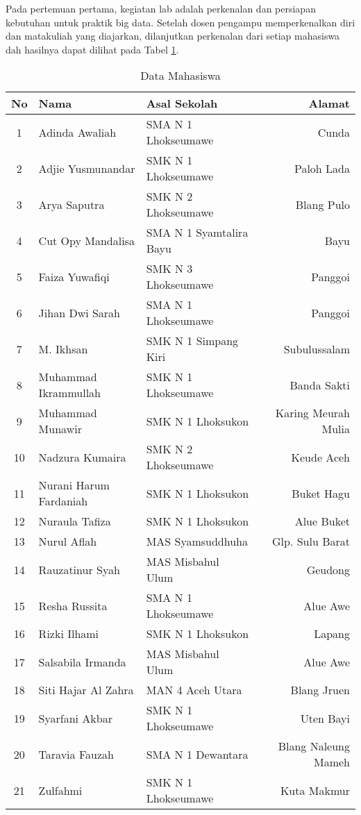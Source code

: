 \documentclass[a4paper]{tufte-handout}
\begin{document}
\clearpage
{}


Pada pertemuan pertama, kegiatan lab adalah perkenalan dan persiapan kebutuhan untuk praktik big data. Setelah dosen pengampu memperkenalkan diri dan matakuliah yang diajarkan, dilanjutkan perkenalan dari setiap mahasiswa dah hasilnya dapat dilihat pada Tabel \ref{tab:perkenalan}.

\begin{table}[!ht]
\vspace*{.5cm}
\caption{Data Mahasiswa}
\label{tab:perkenalan}
\centering
\begin{tabular}{cllr} 
\toprule
No & Nama 				& Asal Sekolah 				& Alamat\\
\midrule
1 	& Adinda Awaliah	& SMA N 1 Lhokseumawe 		& Cunda \\
2 	& Adjie Yusmunandar	& SMK N 1 Lhokseumawe 		& Paloh Lada \\
3 	& Arya Saputra 		& SMK N 2 Lhokseumawe 		& Blang Pulo \\
4 	& Cut Opy Mandalisa	& SMA N 1 Syamtalira Bayu	& Bayu \\
5 	& Faiza Yuwafiqi	& SMK N 3 Lhokseumawe 		& Panggoi \\
6 	& Jihan Dwi Sarah	& SMA N 1 Lhokseumawe 		& Panggoi \\
7 	& M. Ikhsan			& SMK N 1 Simpang Kiri 		& Subulussalam \\
\midrule
8 	& Muhammad Ikrammullah		& SMK N 1 Lhokseumawe 	& Banda Sakti \\
9 	& Muhammad Munawir			& SMK N 1 Lhoksukon		& Karing Meurah Mulia \\
10 	& Nadzura Kumaira			& SMK N 2 Lhokseumawe 	& Keude Aceh \\
11 	& Nurani Harum Fardaniah	& SMK N 1 Lhoksukon 	& Buket Hagu \\
12 	& Nuraula Tafiza			& SMK N 1 Lhoksukon 	& Alue Buket \\
13 	& Nurul Aflah				& MAS Syamsuddhuha		& Glp. Sulu Barat \\
14 	& Rauzatinur Syah			& MAS Misbahul Ulum 	& Geudong \\
\midrule
15 	& Resha Russita			& SMA N 1 Lhokseumawe 	& Alue Awe \\
16 	& Rizki Ilhami			& SMK N 1 Lhoksukon 	& Lapang \\
17 	& Salsabila Irmanda		& MAS Misbahul Ulum 	& Alue Awe \\
18 	& Siti Hajar Al Zahra	& MAN 4 Aceh Utara 		& Blang Jruen \\
19 	& Syarfani Akbar		& SMK N 1 Lhokseumawe 	& Uten Bayi \\
20 	& Taravia Fauzah		& SMA N 1 Dewantara 	& Blang Naleung Mameh \\
21 	& Zulfahmi				& SMK N 1 Lhokseumawe	& Kuta Makmur \\
\bottomrule
\end{tabular}
\end{table}
\end{document}
